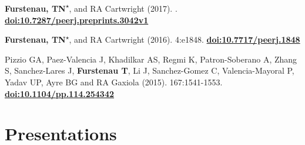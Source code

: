 \documentclass[]{cv-style}          %
\begin{document}
\textbf{Furstenau, TN}\textsuperscript{$\star$}, and RA Cartwright (2017).  . \textbf{\href{| https://doi.org/10.7287/peerj.preprints.3042v1}{doi:10.7287/peerj.preprints.3042v1}}

\textbf{Furstenau, TN}\textsuperscript{$\star$}, and RA Cartwright (2016).   4:e1848. \textbf{\href{https://doi.org/10.7717/peerj.1848}{doi:10.7717/peerj.1848}}

Pizzio GA, Paez-Valencia J, Khadilkar AS, Regmi K, Patron-Soberano A, Zhang S, Sanchez-Lares J, \textbf{Furstenau T}, Li J, Sanchez-Gomez C, Valencia-Mayoral P, Yadav UP, Ayre BG and RA Gaxiola (2015).   167:1541-1553. \textbf{\href{http://dx.doi.org/10.1104/pp.114.254342}{doi:10.1104/pp.114.254342}}

    

\section{Presentations}
\end{document}
